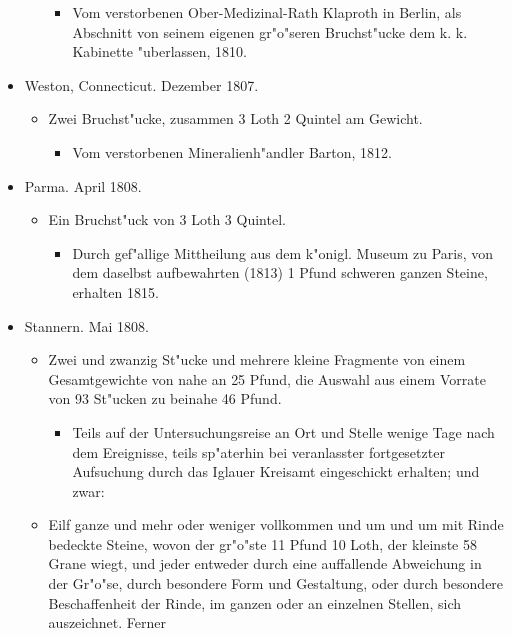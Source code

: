 \documentclass[a4paper, 11pt, oneside, polutonikogreek, german]{article}
\begin{document}
\begin{itemize}
\begin{itemize}
        \begin{itemize}
            \item Vom verstorbenen Ober-Medizinal-Rath Klaproth in Berlin, als Abschnitt von seinem eigenen gr"o"seren Bruchst"ucke dem k. k. Kabinette "uberlassen, 1810.
        \end{itemize}
    \end{itemize}
    \item Weston, Connecticut. Dezember 1807.
    \begin{itemize}
        \item Zwei Bruchst"ucke, zusammen 3 Loth 2 Quintel am Gewicht.
        \begin{itemize}
            \item Vom verstorbenen Mineralienh"andler Barton, 1812.
        \end{itemize}
    \end{itemize}
    \item Parma. April 1808.
    \begin{itemize}
        \item Ein Bruchst"uck von 3 Loth 3 Quintel.
        \begin{itemize}
            \item Durch gef"allige Mittheilung aus dem k"onigl. Museum zu Paris, von dem daselbst aufbewahrten (1813) 1 Pfund schweren ganzen Steine, erhalten 1815.
        \end{itemize}
    \end{itemize}
    \item Stannern. Mai 1808.
    \begin{itemize}
        \item Zwei und zwanzig St"ucke und mehrere kleine Fragmente von einem Gesamtgewichte von nahe an 25 Pfund, die Auswahl aus einem Vorrate von 93 St"ucken zu beinahe 46 Pfund.
        \begin{itemize}
            \item Teils auf der Untersuchungsreise an Ort und Stelle wenige Tage nach dem Ereignisse, teils sp"aterhin bei veranlasster fortgesetzter Aufsuchung durch das Iglauer Kreisamt eingeschickt erhalten; und zwar:
        \end{itemize}
        \item Eilf ganze und mehr oder weniger vollkommen und um und um mit Rinde bedeckte Steine, wovon der gr"o"ste 11 Pfund 10 Loth, der kleinste 58 Grane wiegt, und jeder entweder durch eine auffallende Abweichung in der Gr"o"se, durch besondere Form und Gestaltung, oder durch besondere Beschaffenheit der Rinde, im ganzen oder an einzelnen Stellen, sich auszeichnet. Ferner

\end{itemize}
\end{itemize}
\end{document}
